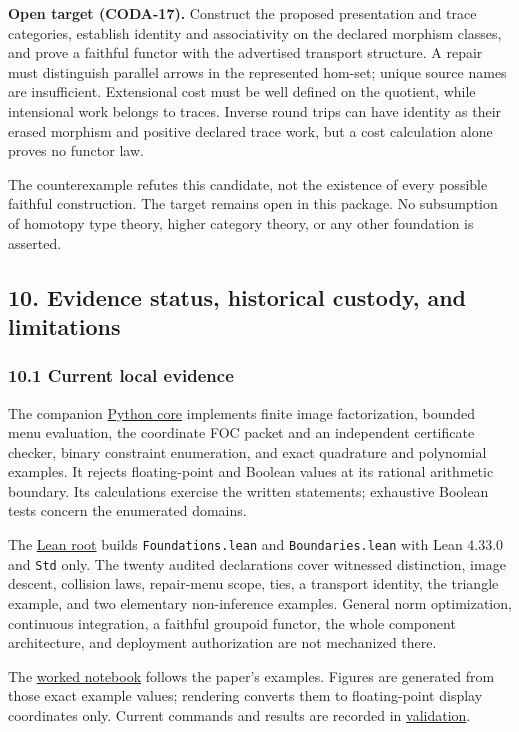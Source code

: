 \documentclass[
  11pt,
]{article}
\begin{document}
\textbf{Open target (CODA-17).} Construct the proposed presentation and trace categories, establish identity and associativity on the declared morphism classes, and prove a faithful functor with the advertised transport structure. A repair must distinguish parallel arrows in the represented hom-set; unique source names are insufficient. Extensional cost must be well defined on the quotient, while intensional work belongs to traces. Inverse round trips can have identity as their erased morphism and positive declared trace work, but a cost calculation alone proves no functor law.

The counterexample refutes this candidate, not the existence of every possible faithful construction. The target remains open in this package. No subsumption of homotopy type theory, higher category theory, or any other foundation is asserted.

\subsection{10. Evidence status, historical custody, and limitations}\label{evidence-status-historical-custody-and-limitations}

\subsubsection{10.1 Current local evidence}\label{current-local-evidence}

The companion \href{code/coda_core.py}{Python core} implements finite image factorization, bounded menu evaluation, the coordinate FOC packet and an independent certificate checker, binary constraint enumeration, and exact quadrature and polynomial examples. It rejects floating-point and Boolean values at its rational arithmetic boundary. Its calculations exercise the written statements; exhaustive Boolean tests concern the enumerated domains.

The \href{lean4/README.md}{Lean root} builds \texttt{Foundations.lean} and \texttt{Boundaries.lean} with Lean 4.33.0 and \texttt{Std} only. The twenty audited declarations cover witnessed distinction, image descent, collision laws, repair-menu scope, ties, a transport identity, the triangle example, and two elementary non-inference examples. General norm optimization, continuous integration, a faithful groupoid functor, the whole component architecture, and deployment authorization are not mechanized there.

The \href{jupyter_notebooks/01_coda_walkthrough.ipynb}{worked notebook} follows the paper's examples. Figures are generated from those exact example values; rendering converts them to floating-point display coordinates only. Current commands and results are recorded in \href{docs/validation.md}{validation}.
\end{document}

